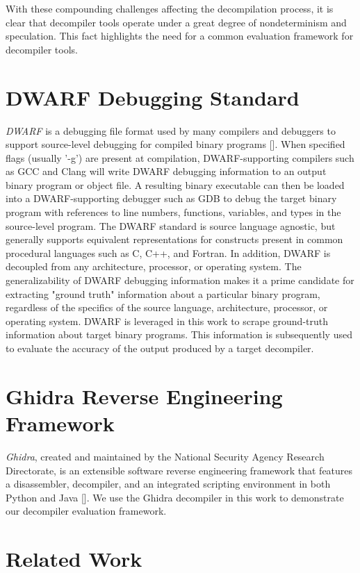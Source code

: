 With these compounding challenges affecting the decompilation process, it is clear that decompiler tools operate under a great degree of nondeterminism and speculation. This fact highlights the need for a common evaluation framework for decompiler tools.

\section{DWARF Debugging Standard}

\emph{DWARF} is a debugging file format used by many compilers and debuggers to support source-level debugging for compiled binary programs []. When specified flags (usually '-g') are present at compilation, DWARF-supporting compilers such as GCC and Clang will write DWARF debugging information to an output binary program or object file. A resulting binary executable can then be loaded into a DWARF-supporting debugger such as GDB to debug the target binary program with references to line numbers, functions, variables, and types in the source-level program. The DWARF standard is source language agnostic, but generally supports equivalent representations for constructs present in common procedural languages such as C, C++, and Fortran. In addition, DWARF is decoupled from any architecture, processor, or operating system. The generalizability of DWARF debugging information makes it a prime candidate for extracting "ground truth" information about a particular binary program, regardless of the specifics of the source language, architecture, processor, or operating system. DWARF is leveraged in this work to scrape ground-truth information about target binary programs. This information is subsequently used to evaluate the accuracy of the output produced by a target decompiler.

\section{Ghidra Reverse Engineering Framework}

\emph{Ghidra}, created and maintained by the National Security Agency Research Directorate, is an extensible software reverse engineering framework that features a disassembler, decompiler, and an integrated scripting environment in both Python and Java []. We use the Ghidra decompiler in this work to demonstrate our decompiler evaluation framework.

\section{Related Work}

